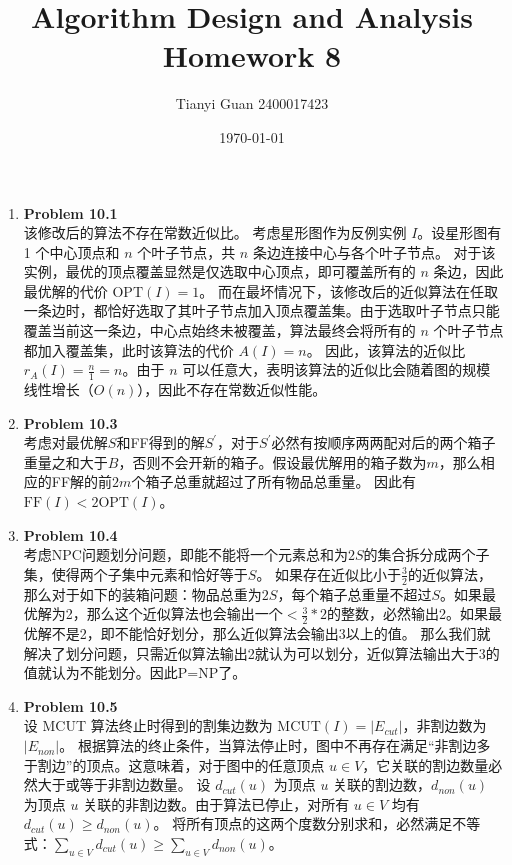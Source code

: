 \documentclass{ctexart}
\title{\vspace*{-1cm}Algorithm Design and Analysis Homework 8}
\author{Tianyi Guan 2400017423}
\date{\today}
\begin{document}
\maketitle
\begin{enumerate}[label=\arabic*.]
    \item \textbf{Problem 10.1}\\该修改后的算法不存在常数近似比。
        考虑星形图作为反例实例 $I$。设星形图有 1 个中心顶点和 $n$ 个叶子节点，共 $n$ 条边连接中心与各个叶子节点。
        对于该实例，最优的顶点覆盖显然是仅选取中心顶点，即可覆盖所有的 $n$ 条边，因此最优解的代价 $\text{OPT}(I) = 1$。
        而在最坏情况下，该修改后的近似算法在任取一条边时，都恰好选取了其叶子节点加入顶点覆盖集。由于选取叶子节点只能覆盖当前这一条边，中心点始终未被覆盖，算法最终会将所有的 $n$ 个叶子节点都加入覆盖集，此时该算法的代价 $A(I) = n$。
        因此，该算法的近似比 $r_A(I) = \frac{n}{1} = n$。由于 $n$ 可以任意大，表明该算法的近似比会随着图的规模线性增长（$O(n)$），因此不存在常数近似性能。
    \item \textbf{Problem 10.3}\\
        考虑对最优解$S$和FF得到的解$S^{'}$，对于$S^{'}$必然有按顺序两两配对后的两个箱子重量之和大于$B$，否则不会开新的箱子。假设最优解用的箱子数为$m$，那么相应的FF解的前$2m$个箱子总重就超过了所有物品总重量。
        因此有$\text{FF}(I)<2\text{OPT}(I)$。
    \item \textbf{Problem 10.4}\\
        考虑NPC问题划分问题，即能不能将一个元素总和为$2S$的集合拆分成两个子集，使得两个子集中元素和恰好等于$S$。
        如果存在近似比小于$\frac{3}{2}$的近似算法，那么对于如下的装箱问题：物品总重为$2S$，每个箱子总重量不超过$S$。如果最优解为2，那么这个近似算法也会输出一个$<\frac{3}{2}*2$的整数，必然输出2。如果最优解不是2，即不能恰好划分，那么近似算法会输出3以上的值。
        那么我们就解决了划分问题，只需近似算法输出2就认为可以划分，近似算法输出大于3的值就认为不能划分。因此P=NP了。
    \item \textbf{Problem 10.5}\\
        设 MCUT 算法终止时得到的割集边数为 $\text{MCUT}(I) = |E_{cut}|$，非割边数为 $|E_{non}|$。
        根据算法的终止条件，当算法停止时，图中不再存在满足“非割边多于割边”的顶点。这意味着，对于图中的任意顶点 $u \in V$，它关联的割边数量必然大于或等于非割边数量。
        设 $d_{cut}(u)$ 为顶点 $u$ 关联的割边数，$d_{non}(u)$ 为顶点 $u$ 关联的非割边数。由于算法已停止，对所有 $u \in V$ 均有 $d_{cut}(u) \ge d_{non}(u)$。
        将所有顶点的这两个度数分别求和，必然满足不等式：$\sum_{u \in V} d_{cut}(u) \ge \sum_{u \in V} d_{non}(u)$。

\end{enumerate}
\end{document}

